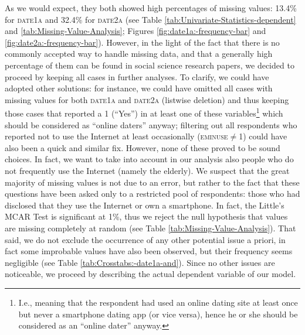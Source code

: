 As we would expect, they both showed high percentages of missing values:
13.4\% for \textsc{date1a} and 32.4\% for\textsc{ date2a} (see Table
\ref{tab:Univariate-Statistics-dependent} and \ref{tab:Missing-Value-Analysis};
Figures \ref{fig:date1a:-frequency-bar} and \ref{fig:date2a:-frequency-bar}).
However, in the light of the fact that there is no commonly accepted
way to handle missing data, and that a generally high percentage of
them can be found in social science research papers, we decided to
proceed by keeping all cases in further analyses. To clarify, we could
have adopted other solutions: for instance, we could have omitted
all cases with missing values for both \textsc{date1a} and \textsc{date2a}
(listwise deletion) \textendash{} and thus keeping those cases that
reported a 1 (\textquotedblleft Yes\textquotedblright ) in at least
one of these variables\footnote{I.e., meaning that the respondent had used an online dating site at
least once but never a smartphone dating app (or vice versa), hence
he or she should be considered as an \textquotedblleft online dater\textquotedblright{}
anyway.} \textendash{} which should be considered as \textquotedblleft online
daters\textquotedblright{} anyway; filtering out all respondents who
reported not to use the Internet at least occasionally (\textsc{eminuse}$\neq$1)
could have also been a quick and similar fix. However, none of these
proved to be sound choices. In fact, we want to take into account
in our analysis also people who do not frequently use the Internet
(namely the elderly). We suspect that the great majority of missing
values is not due to an error, but rather to the fact that these questions
have been asked only to a restricted pool of respondents: those who
had disclosed that they use the Internet or own a smartphone. In fact,
the Little's MCAR Test is significant at 1\%, thus we reject the null
hypothesis that values are missing completely at random (see Table
\ref{tab:Missing-Value-Analysis}). That said, we do not exclude the
occurrence of any other potential issue a priori, in fact some improbable
values have also been observed, but their frequency seems negligible
(see Table \ref{tab:Crosstabs:-date1a-and}). Since no other issues
are noticeable, we proceed by describing the actual dependent variable
of our model.

